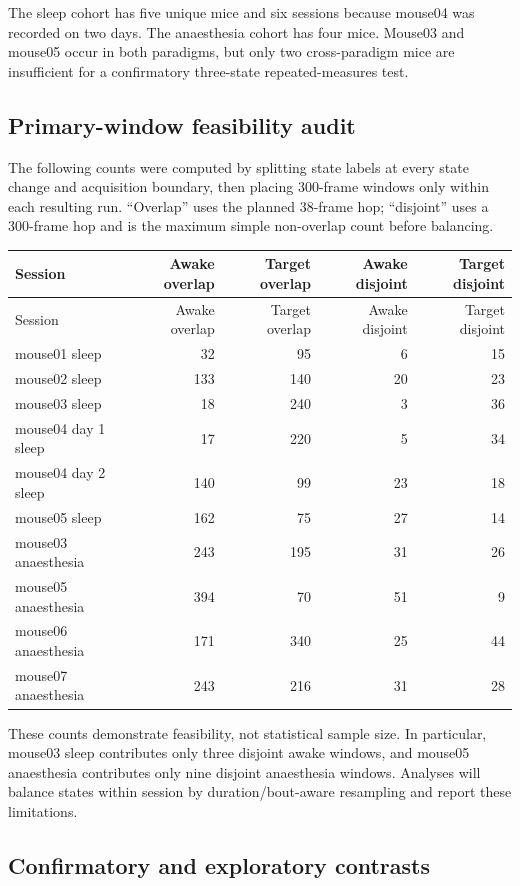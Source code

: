 \documentclass[11pt,a4paper]{article}
\begin{document}
The sleep cohort has five unique mice and six sessions because mouse04 was recorded on two days. The anaesthesia cohort has four mice. Mouse03 and mouse05 occur in both paradigms, but only two cross-paradigm mice are insufficient for a confirmatory three-state repeated-measures test.

\subsection{Primary-window feasibility audit}

The following counts were computed by splitting state labels at every state change and acquisition boundary, then placing 300-frame windows only within each resulting run. ``Overlap'' uses the planned 38-frame hop; ``disjoint'' uses a 300-frame hop and is the maximum simple non-overlap count before balancing.

\begin{longtable}{@{}P{0.28\textwidth}rrrr@{}}
\toprule
Session & Awake overlap & Target overlap & Awake disjoint & Target disjoint\\
\midrule
\endfirsthead
\toprule
Session & Awake overlap & Target overlap & Awake disjoint & Target disjoint\\
\midrule
\endhead
mouse01 sleep & 32 & 95 & 6 & 15\\
mouse02 sleep & 133 & 140 & 20 & 23\\
mouse03 sleep & 18 & 240 & 3 & 36\\
mouse04 day 1 sleep & 17 & 220 & 5 & 34\\
mouse04 day 2 sleep & 140 & 99 & 23 & 18\\
mouse05 sleep & 162 & 75 & 27 & 14\\
mouse03 anaesthesia & 243 & 195 & 31 & 26\\
mouse05 anaesthesia & 394 & 70 & 51 & 9\\
mouse06 anaesthesia & 171 & 340 & 25 & 44\\
mouse07 anaesthesia & 243 & 216 & 31 & 28\\
\bottomrule
\end{longtable}

These counts demonstrate feasibility, not statistical sample size. In particular, mouse03 sleep contributes only three disjoint awake windows, and mouse05 anaesthesia contributes only nine disjoint anaesthesia windows. Analyses will balance states within session by duration/bout-aware resampling and report these limitations.

\subsection{Confirmatory and exploratory contrasts}
\end{document}

